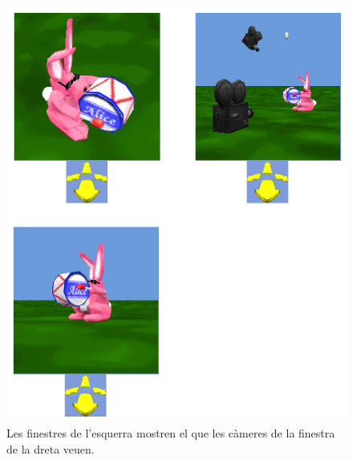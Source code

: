
\begin{figure}[h!]
\begin{center}
\includegraphics[scale=0.5]{Imatges/figura25-11}
\end{center}
\caption{Les finestres de l'esquerra mostren el que les càmeres de la finestra de la dreta veuen.}
\label{fig2511}
\end{figure}

